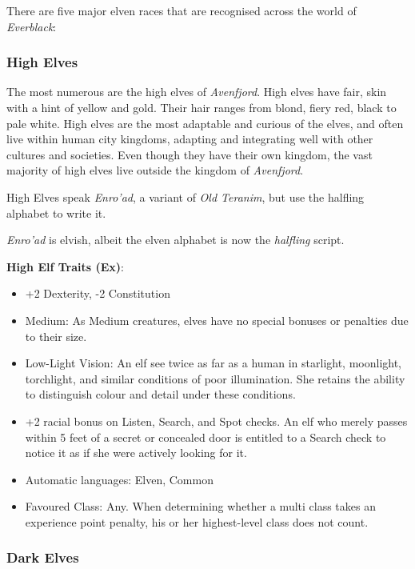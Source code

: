 There are five major elven races that are recognised across the world of
\emph{Everblack}:

\subsubsection*{High Elves}

The most numerous are the high elves of \emph{Avenfjord}. High elves have
fair, skin with a hint of yellow and gold. Their hair ranges from blond, fiery
red, black to pale white. High elves are the most adaptable and curious of the
elves, and often live within human city kingdoms, adapting and integrating
well with other cultures and societies. Even though they have their own
kingdom, the vast majority of high elves live outside the kingdom
of \emph{Avenfjord}.

High Elves speak \emph{Enro'ad}, a variant of \emph{Old Teranim}, but use the
halfling alphabet to write it.

\begin{35e}
  \emph{Enro'ad} is elvish, albeit the elven alphabet is now the \emph{halfling}
  script.

  \textbf{High Elf Traits (Ex)}:
  \begin{itemize}[noitemsep]
    \item +2 Dexterity, -2 Constitution
    \item Medium: As Medium creatures, elves have no special bonuses or
    penalties due to their size.
    \item Low-Light Vision: An elf see twice as far as a human in starlight,
    moonlight, torchlight, and similar conditions of poor illumination. She
    retains the ability to distinguish colour and detail under these
    conditions.
    \item +2 racial bonus on Listen, Search, and Spot checks. An elf who
    merely passes within 5 feet of a secret or concealed door is entitled to a
    Search check to notice it as if she were actively looking for it.
    \item Automatic languages: Elven, Common
    \item Favoured Class: Any. When determining whether a multi class takes an
    experience point penalty, his or her highest-level class does not count.
  \end{itemize}
\end{35e}

\subsubsection*{Dark Elves}

